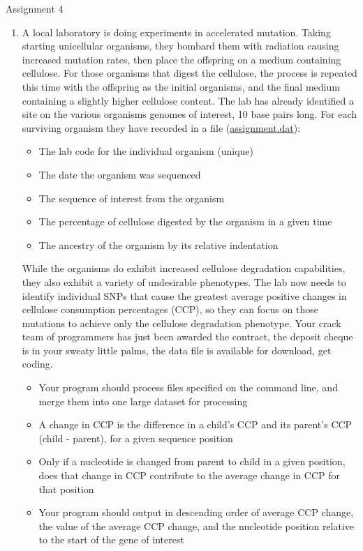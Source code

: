 \hypertarget{assignment4}{Assignment 4}
\begin{enumerate}
	\item A local laboratory is doing    experiments in accelerated mutation. Taking starting unicellular    organisms, they bombard them with radiation causing increased    mutation rates, then place the offspring on a medium containing    cellulose. For those organisms that digest the cellulose, the    process is repeated this time with the offspring as the initial    organisms, and the final medium containing a slightly higher    cellulose content. The lab has already identified a site on the    various organisms genomes of interest, 10 base pairs    long. For each surviving organism they have recorded in a file (\href{data/assignment4.dat}{assignment.dat}):        
\begin{itemize}
	\item The lab code for the individual organism (unique)
	\item The date the organism was sequenced
	\item The sequence of interest from the organism
	\item The percentage of cellulose digested by the organism in a given time
	\item The ancestry of the organism by its relative indentation
\end{itemize}        While the organisms do exhibit increased cellulose degradation    capabilities, they also exhibit a variety of undesirable    phenotypes. The lab now needs to identify individual SNPs that    cause the greatest average positive changes in cellulose    consumption percentages (CCP), so they can focus on those mutations    to achieve only the cellulose degradation phenotype. Your crack    team of programmers has just been awarded the contract, the deposit    cheque is in your sweaty little palms, the data file is available    for download, get coding.     
\begin{itemize}
	\item Your program should process files specified on the command line, and merge them into one large dataset for processing
	\item A change in CCP is the difference in a child's CCP and its parent's CCP (child - parent), for a given sequence position
	\item Only if a nucleotide is changed from parent to child in a given position, does that change in CCP contribute to the average change in CCP for that position
	\item Your program should output in descending order of average CCP change, the value of the average CCP change, and the nucleotide position relative to the start of the gene of interest

\end{itemize}
\end{enumerate}
